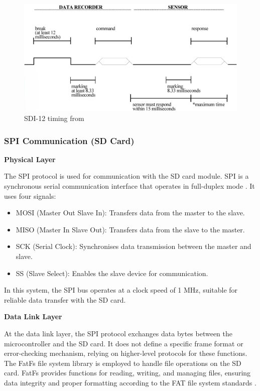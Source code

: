 \begin{figure}
    \includegraphics[width=\linewidth]{figures/SDI-12_timing.png}
    \caption{SDI-12 timing from \cite{sdi12_datasheet}}
    \label{sdi12_timing}
\end{figure}

\subsubsection{SPI Communication (SD Card)}

\textbf{Physical Layer}

The SPI protocol is used for communication with the SD card module. SPI is a synchronous serial communication 
interface that operates in full-duplex mode \cite{SPIDevice}. It uses four signals:
\begin{itemize}
    \item MOSI (Master Out Slave In): Transfers data from the master to the slave.
    \item MISO (Master In Slave Out): Transfers data from the slave to the master.
    \item SCK (Serial Clock): Synchronises data transmission between the master and slave.
    \item SS (Slave Select): Enables the slave device for communication.
\end{itemize}
In this system, the SPI bus operates at a clock speed of 1 MHz, suitable for reliable data transfer 
with the SD card.

\textbf{Data Link Layer}

At the data link layer, the SPI protocol exchanges data bytes between the microcontroller 
and the SD card. It does not define a specific frame format or error-checking mechanism, relying on 
higher-level protocols for these functions. The FatFs file system library is employed to handle file 
operations on the SD card. FatFs provides functions for reading, writing, and managing files, ensuring 
data integrity and proper formatting according to the FAT file system standards \cite{NXPMSDFATFSAPI}.


